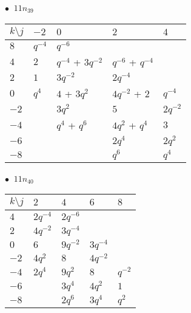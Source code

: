 %
\begin{minipage}{\linewidth}
$\bullet\ $ $11n_{39}$ \vspace{0.5em} \\
\begin{tabular}{l|llll}
$k \setminus j$ & $-2$ & $0$ & $2$ & $4$ \\
\hline
$8$ & $q^{-4}$ & $q^{-6}$ &  &  \\
$4$ & $2$ & $q^{-4}$ + $3q^{-2}$ & $q^{-6}$ + $q^{-4}$ &  \\
$2$ & $1$ & $3q^{-2}$ & $2q^{-4}$ &  \\
$0$ & $q^{4}$ & $4$ + $3q^{2}$ & $4q^{-2}$ + $2$ & $q^{-4}$ \\
$-2$ &  & $3q^{2}$ & $5$ & $2q^{-2}$ \\
$-4$ &  & $q^{4}$ + $q^{6}$ & $4q^{2}$ + $q^{4}$ & $3$ \\
$-6$ &  &  & $2q^{4}$ & $2q^{2}$ \\
$-8$ &  &  & $q^{6}$ & $q^{4}$ \\
\end{tabular}
\vspace{2em}
\end{minipage}
%
\begin{minipage}{\linewidth}
$\bullet\ $ $11n_{40}$ \vspace{0.5em} \\
\begin{tabular}{l|llll}
$k \setminus j$ & $2$ & $4$ & $6$ & $8$ \\
\hline
$4$ & $2q^{-4}$ & $2q^{-6}$ &  &  \\
$2$ & $4q^{-2}$ & $3q^{-4}$ &  &  \\
$0$ & $6$ & $9q^{-2}$ & $3q^{-4}$ &  \\
$-2$ & $4q^{2}$ & $8$ & $4q^{-2}$ &  \\
$-4$ & $2q^{4}$ & $9q^{2}$ & $8$ & $q^{-2}$ \\
$-6$ &  & $3q^{4}$ & $4q^{2}$ & $1$ \\
$-8$ &  & $2q^{6}$ & $3q^{4}$ & $q^{2}$ \\
\end{tabular}
\vspace{2em}
\end{minipage}
%
